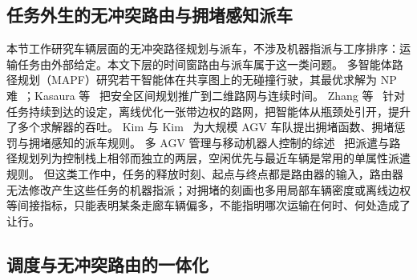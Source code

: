 \documentclass[manuscript,screen,review]{acmart}
\begin{document}
\subsection{任务外生的无冲突路由与拥堵感知派车}
\label{sec:rw_route}

本节工作研究车辆层面的无冲突路径规划与派车，不涉及机器指派与工序排序：运输任务由外部给定。本文下层的时间窗路由与派车属于这一类问题。
多智能体路径规划（MAPF）研究若干智能体在共享图上的无碰撞行驶，其最优求解为 NP 难~\cite{gao2023mapf}；Kasaura 等~\cite{kasaura2022sipp} 把安全区间规划推广到二维路网与连续时间。
Zhang 等~\cite{zhang2024guidance} 针对任务持续到达的设定，离线优化一张带边权的路网，把智能体从瓶颈处引开，提升了多个求解器的吞吐。
Kim 与 Kim~\cite{kim2026congestion} 为大规模 AGV 车队提出拥堵函数、拥堵惩罚与拥堵感知的派车规则。
多 AGV 管理与移动机器人控制的综述~\cite{lu2022agv,fragapane2021planning} 把派遣与路径规划列为控制栈上相邻而独立的两层，空闲优先与最近车辆是常用的单属性派遣规则。
但这类工作中，任务的释放时刻、起点与终点都是路由器的输入，路由器无法修改产生这些任务的机器指派；对拥堵的刻画也多用局部车辆密度或离线边权等间接指标，只能表明某条走廊车辆偏多，不能指明哪次运输在何时、何处造成了让行。

\subsection{调度与无冲突路由的一体化}
\label{sec:rw_integ}
\end{document}
